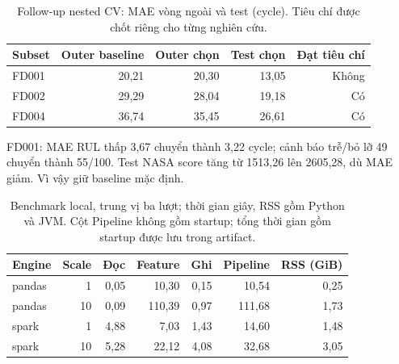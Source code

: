 \begin{table}[H]\centering\small
\caption[Nested CV bổ sung]{Follow-up nested CV: MAE vòng ngoài và test (cycle). Tiêu chí được chốt riêng cho từng nghiên cứu.}
\label{tab:followup}\begin{tabular}{lrrrr}\toprule
Subset & Outer baseline & Outer chọn & Test chọn & Đạt tiêu chí\\\midrule
FD001 & 20,21 & 20,30 & 13,05 & Không\\
FD002 & 29,29 & 28,04 & 19,18 & Có\\
FD004 & 36,74 & 35,45 & 26,61 & Có\\
\bottomrule\end{tabular}\end{table}
FD001: MAE RUL thấp 3,67 chuyển thành 3,22 cycle; cảnh báo trễ/bỏ lỡ 49 chuyển thành 55/100. Test NASA score tăng từ 1513,26 lên 2605,28, dù MAE giảm. Vì vậy giữ baseline mặc định.
\begin{table}[H]\centering\small
\caption[Benchmark local]{Benchmark local, trung vị ba lượt; thời gian giây, RSS gồm Python và JVM. Cột Pipeline không gồm startup; tổng thời gian gồm startup được lưu trong artifact.}
\label{tab:followup-benchmark}\begin{tabular}{lrrrrrr}\toprule
Engine & Scale & Đọc & Feature & Ghi & Pipeline & RSS (GiB)\\\midrule
pandas & 1 & 0,05 & 10,30 & 0,15 & 10,54 & 0,25\\
pandas & 10 & 0,09 & 110,39 & 0,97 & 111,68 & 1,73\\
spark & 1 & 4,88 & 7,03 & 1,43 & 14,60 & 1,48\\
spark & 10 & 5,28 & 22,12 & 4,08 & 32,68 & 3,05\\
\bottomrule\end{tabular}\end{table}
